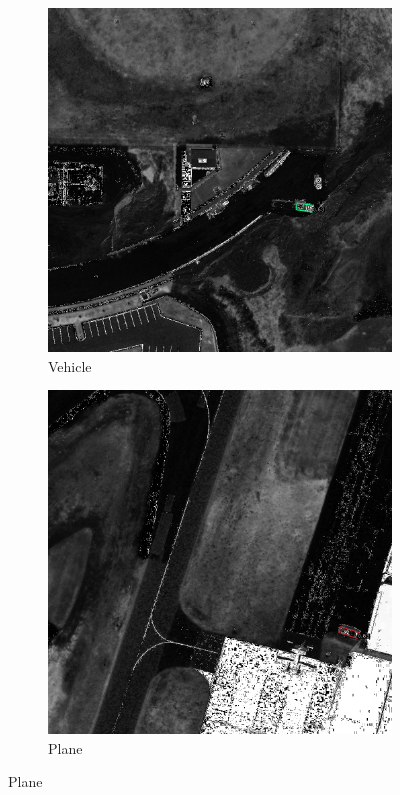 \begin{figure}[h!]
    \begin{subfigure}[t]{0.38\textwidth}
        \centering
        \includegraphics[width=\linewidth]{images/015Results/03ablation/comp_images/ndvi/427.png}
        \caption{Vehicle}
    \end{subfigure}
    \begin{subfigure}[t]{0.38\textwidth}
        \centering
        \includegraphics[width=\linewidth]{images/015Results/03ablation/comp_images/ndvi/487.png}
        \caption{Plane}
    \end{subfigure}
    

\end{figure}
